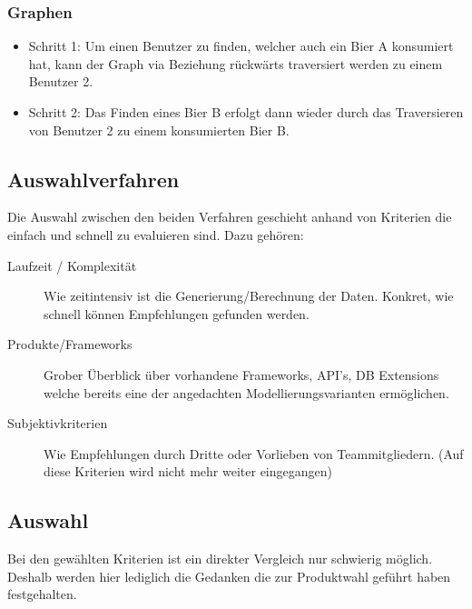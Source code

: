 \documentclass[10pt,a4paper]{scrartcl}
\begin{document}
\subsubsection{Graphen}

\begin{itemize}
	\item Schritt 1: Um einen Benutzer zu finden, welcher auch ein Bier A konsumiert hat, kann der
		Graph via Beziehung rückwärts traversiert werden zu einem Benutzer 2.
	\item Schritt 2: Das Finden eines Bier B erfolgt dann wieder durch das Traversieren von Benutzer 2
		zu einem konsumierten Bier B.
\end{itemize}

\subsection{Auswahlverfahren}

Die Auswahl zwischen den beiden Verfahren geschieht anhand von Kriterien die einfach und schnell zu
evaluieren sind. Dazu gehören:

\begin{description}
	\item[Laufzeit / Komplexität] Wie zeitintensiv ist die Generierung/Berechnung der Daten. Konkret,
		wie schnell können Empfehlungen gefunden werden.
	\item[Produkte/Frameworks] Grober Überblick über vorhandene Frameworks, API's, DB Extensions welche
		bereits eine der angedachten Modellierungsvarianten ermöglichen.
	\item[Subjektivkriterien] Wie Empfehlungen durch Dritte oder Vorlieben von Teammitgliedern. (Auf
		diese Kriterien wird nicht mehr weiter eingegangen)
\end{description}

\subsection{Auswahl}

Bei den gewählten Kriterien ist ein direkter Vergleich nur schwierig möglich. Deshalb werden hier
lediglich die Gedanken die zur Produktwahl geführt haben festgehalten.
\end{document}
